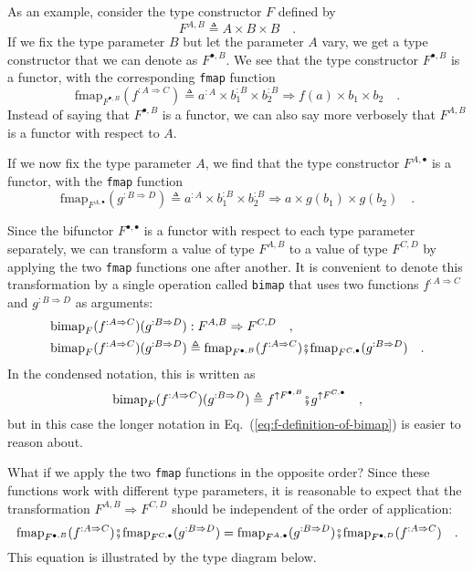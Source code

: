 As an example, consider the type constructor $F$ defined by
\[
F^{A,B}\triangleq A\times B\times B\quad.
\]
If we fix the type parameter $B$ but let the parameter $A$ vary,
we get a type constructor that we can denote as $F^{\bullet,B}$.
We see that the type constructor $F^{\bullet,B}$ is a functor, with
the corresponding \lstinline!fmap! function
\[
\text{fmap}_{F^{\bullet,B}}(f^{:A\Rightarrow C})\triangleq a^{:A}\times b_{1}^{:B}\times b_{2}^{:B}\Rightarrow f(a)\times b_{1}\times b_{2}\quad.
\]
Instead of saying that $F^{\bullet,B}$ is a functor, we can also
say more verbosely that $F^{A,B}$ is a functor with respect to $A$. 

If we now fix the type parameter $A$, we find that the type constructor
$F^{A,\bullet}$ is a functor, with the \lstinline!fmap! function
\[
\text{fmap}_{F^{A,\bullet}}(g^{:B\Rightarrow D})\triangleq a^{:A}\times b_{1}^{:B}\times b_{2}^{:B}\Rightarrow a\times g(b_{1})\times g(b_{2})\quad.
\]

Since the bifunctor $F^{\bullet,\bullet}$ is a functor with respect
to each type parameter separately, we can transform a value of type
$F^{A,B}$ to a value of type $F^{C,D}$ by applying the two \lstinline!fmap!
functions one after another. It is convenient to denote this transformation
by a single operation called \lstinline!bimap! that uses two functions
$f^{:A\Rightarrow C}$ and $g^{:B\Rightarrow D}$ as arguments:
\begin{align}
\text{bimap}_{F}(f^{:A\Rightarrow C})(g^{:B\Rightarrow D}) & :F^{A,B}\Rightarrow F^{C,D}\quad,\nonumber \\
\text{bimap}_{F}(f^{:A\Rightarrow C})(g^{:B\Rightarrow D}) & \triangleq\text{fmap}_{F^{\bullet,B}}(f^{:A\Rightarrow C})\bef\text{fmap}_{F^{C,\bullet}}(g^{:B\Rightarrow D})\quad.\label{eq:f-definition-of-bimap}
\end{align}
In the condensed notation, this is written as
\[
\text{bimap}_{F}(f^{:A\Rightarrow C})(g^{:B\Rightarrow D})\triangleq f^{\uparrow F^{\bullet,B}}\bef g^{\uparrow F^{C,\bullet}}\quad,
\]
but in this case the longer notation in Eq.~(\ref{eq:f-definition-of-bimap})
is easier to reason about. 

What if we apply the two \lstinline!fmap! functions in the opposite
order? Since these functions work with different type parameters,
it is reasonable to expect that the transformation $F^{A,B}\Rightarrow F^{C,D}$
should be independent of the order of application:
\begin{equation}
\text{fmap}_{F^{\bullet,B}}(f^{:A\Rightarrow C})\bef\text{fmap}_{F^{C,\bullet}}(g^{:B\Rightarrow D})=\text{fmap}_{F^{A,\bullet}}(g^{:B\Rightarrow D})\bef\text{fmap}_{F^{\bullet,D}}(f^{:A\Rightarrow C})\quad.\label{eq:f-fmap-fmap-bifunctor-commutativity}
\end{equation}
This equation is illustrated by the type diagram below.

